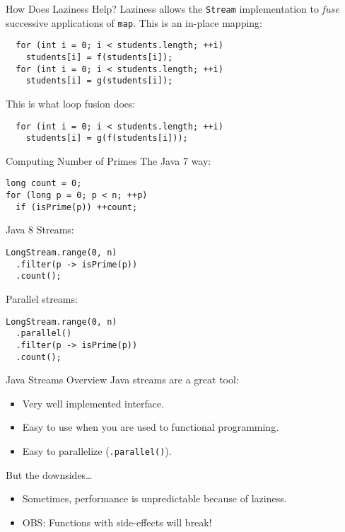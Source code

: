 \documentclass{beamer}
\begin{document}
\begin{frame}[fragile]{How Does Laziness Help?}
Laziness allows the \lstinline{Stream} implementation to \emph{fuse} successive applications of \lstinline{map}. This is an in-place mapping:

\begin{lstlisting}
  for (int i = 0; i < students.length; ++i)
    students[i] = f(students[i]);
  for (int i = 0; i < students.length; ++i)
    students[i] = g(students[i]);
\end{lstlisting}

\pause{} This is what loop fusion does:
\begin{lstlisting}
  for (int i = 0; i < students.length; ++i)
    students[i] = g(f(students[i]));
\end{lstlisting}
\end{frame}

\begin{frame}[fragile]{Computing Number of Primes}
The Java 7 way:
\begin{lstlisting}
long count = 0;
for (long p = 0; p < n; ++p)
  if (isPrime(p)) ++count;
\end{lstlisting}

\pause{} Java 8 Streams:
\begin{lstlisting}
LongStream.range(0, n)
  .filter(p -> isPrime(p))
  .count();
\end{lstlisting}

\pause{} Parallel streams:
\begin{lstlisting}
LongStream.range(0, n)
  .parallel()
  .filter(p -> isPrime(p))
  .count();
\end{lstlisting}
\end{frame}

\begin{frame}{Java Streams Overview}
  Java streams are a great tool:
  \begin{itemize}
  \item Very well implemented interface.
  \item Easy to use when you are used to functional programming.
  \item Easy to parallelize (\lstinline{.parallel()}).
  \end{itemize}

  \pause{} But the downsides\dots{}
  \begin{itemize}
  \item Sometimes, performance is unpredictable because of laziness.
  \item OBS: Functions with side-effects will break!
  \end{itemize}

\end{frame}
\end{document}
